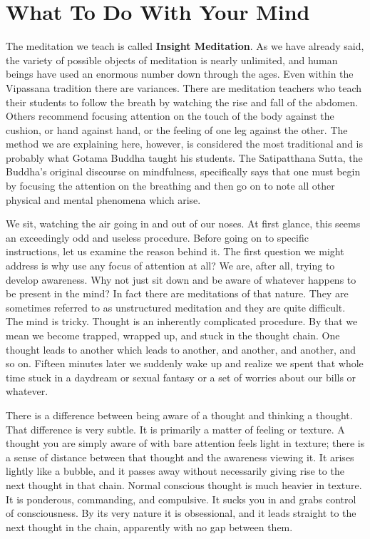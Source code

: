 \section{ What To Do With Your Mind} The meditation we teach is called \textbf{Insight
Meditation}. As we have already said, the variety of possible objects of
meditation is nearly unlimited, and human beings have used an enormous number
down through the ages. Even within the Vipassana tradition there are variances.
There are meditation teachers who teach their students to follow the breath by
watching the rise and fall of the abdomen. Others recommend focusing attention
on the touch of the body against the cushion, or hand against hand, or the
feeling of one leg against the other. The method we are explaining here,
however, is considered the most traditional and is probably what Gotama Buddha
taught his students. The Satipatthana Sutta, the Buddha's original discourse on
mindfulness, specifically says that one must begin by focusing the attention on
the breathing and then go on to note all other physical and mental phenomena
which arise.

We sit, watching the air going in and out of our noses. At first glance, this
seems an exceedingly odd and useless procedure.  Before going on to specific
instructions, let us examine the reason behind it. The first question we might
address is why use any focus of attention at all? We are, after all, trying to
develop awareness. Why not just sit down and be aware of whatever happens to be
present in the mind? In fact there are meditations of that nature. They are
sometimes referred to as unstructured meditation and they are quite difficult.
The mind is tricky. Thought is an inherently complicated procedure. By that we
mean we become trapped, wrapped up, and stuck in the thought chain. One thought
leads to another which leads to another, and another, and another, and so on.
Fifteen minutes later we suddenly wake up and realize we spent that whole time
stuck in a daydream or sexual fantasy or a set of worries about our bills or
whatever.

There is a difference between being aware of a thought and thinking a thought.
That difference is very subtle. It is primarily a matter of feeling or texture.
A thought you are simply aware of with bare attention feels light in texture;
there is a sense of distance between that thought and the awareness viewing it.
It arises lightly like a bubble, and it passes away without necessarily giving
rise to the next thought in that chain. Normal conscious thought is much heavier
in texture. It is ponderous, commanding, and compulsive. It sucks you in and
grabs control of consciousness. By its very nature it is obsessional, and it
leads straight to the next thought in the chain, apparently with no gap between
them.

